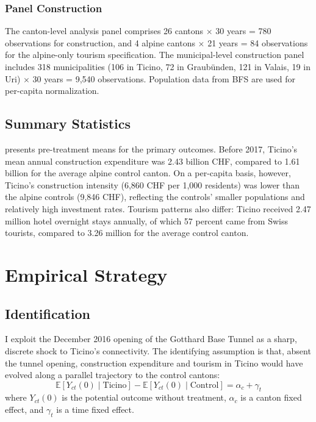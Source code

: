 \documentclass[12pt]{article}
\newcommand{\E}{\mathbb{E}}
\begin{document}
\subsubsection*{Panel Construction} The canton-level analysis panel comprises 26 cantons $\times$ 30 years = 780 observations for construction, and 4 alpine cantons $\times$ 21 years = 84 observations for the alpine-only tourism specification. The municipal-level construction panel includes 318 municipalities (106 in Ticino, 72 in Graub\"unden, 121 in Valais, 19 in Uri) $\times$ 30 years = 9,540 observations. Population data from BFS are used for per-capita normalization.

\subsection{Summary Statistics}

 presents pre-treatment means for the primary outcomes. Before 2017, Ticino's mean annual construction expenditure was 2.43 billion CHF, compared to 1.61 billion for the average alpine control canton. On a per-capita basis, however, Ticino's construction intensity (6,860 CHF per 1,000 residents) was lower than the alpine controls (9,846 CHF), reflecting the controls' smaller populations and relatively high investment rates. Tourism patterns also differ: Ticino received 2.47 million hotel overnight stays annually, of which 57 percent came from Swiss tourists, compared to 3.26 million for the average control canton.



\section{Empirical Strategy}

\subsection{Identification}

I exploit the December 2016 opening of the Gotthard Base Tunnel as a sharp, discrete shock to Ticino's connectivity. The identifying assumption is that, absent the tunnel opening, construction expenditure and tourism in Ticino would have evolved along a parallel trajectory to the control cantons:
\begin{equation}
\E[Y_{ct}(0) \mid \text{Ticino}] - \E[Y_{ct}(0) \mid \text{Control}] = \alpha_c + \gamma_t
\end{equation}
where $Y_{ct}(0)$ is the potential outcome without treatment, $\alpha_c$ is a canton fixed effect, and $\gamma_t$ is a time fixed effect.
\end{document}
